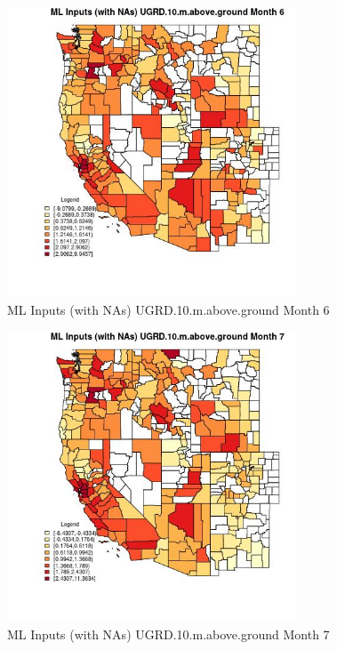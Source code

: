\begin{figure} 
\centering  
\includegraphics[width=0.77\textwidth]{Code_Outputs/Report_ML_input_PM25_Step4_part_f_de_duplicated_aves_prioritize_24hr_obswNAs_CountyUGRD10mabovegroundmedianMonth6.jpg} 
\caption{\label{fig:Report_ML_input_PM25_Step4_part_f_de_duplicated_aves_prioritize_24hr_obswNAsCountyUGRD10mabovegroundmedianMonth6}ML Inputs (with NAs) UGRD.10.m.above.ground Month 6} 
\end{figure} 
 

\begin{figure} 
\centering  
\includegraphics[width=0.77\textwidth]{Code_Outputs/Report_ML_input_PM25_Step4_part_f_de_duplicated_aves_prioritize_24hr_obswNAs_CountyUGRD10mabovegroundmedianMonth7.jpg} 
\caption{\label{fig:Report_ML_input_PM25_Step4_part_f_de_duplicated_aves_prioritize_24hr_obswNAsCountyUGRD10mabovegroundmedianMonth7}ML Inputs (with NAs) UGRD.10.m.above.ground Month 7} 
\end{figure} 
 

